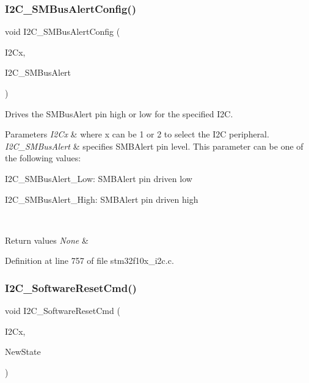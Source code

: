 \subsubsection{\texorpdfstring{I2\+C\+\_\+\+S\+M\+Bus\+Alert\+Config()}{I2C\_SMBusAlertConfig()}}
{\footnotesize\ttfamily void I2\+C\+\_\+\+S\+M\+Bus\+Alert\+Config (\begin{DoxyParamCaption}\item[{\hyperlink{struct_i2_c___type_def}{I2\+C\+\_\+\+Type\+Def} $\ast$}]{I2\+Cx,  }\item[{uint16\+\_\+t}]{I2\+C\+\_\+\+S\+M\+Bus\+Alert }\end{DoxyParamCaption})}



Drives the S\+M\+Bus\+Alert pin high or low for the specified I2C. 


\begin{DoxyParams}{Parameters}
{\em I2\+Cx} & where x can be 1 or 2 to select the I2C peripheral. \\
\hline
{\em I2\+C\+\_\+\+S\+M\+Bus\+Alert} & specifies S\+M\+B\+Alert pin level. This parameter can be one of the following values\+: \begin{DoxyItemize}
\item I2\+C\+\_\+\+S\+M\+Bus\+Alert\+\_\+\+Low\+: S\+M\+B\+Alert pin driven low \item I2\+C\+\_\+\+S\+M\+Bus\+Alert\+\_\+\+High\+: S\+M\+B\+Alert pin driven high \end{DoxyItemize}
\\
\hline
\end{DoxyParams}

\begin{DoxyRetVals}{Return values}
{\em None} & \\
\hline
\end{DoxyRetVals}


Definition at line 757 of file stm32f10x\+\_\+i2c.\+c.

\mbox{\label{group___i2_c___exported___functions_ga1289c908aeb882443aba323b459c638b}} 
\subsubsection{\texorpdfstring{I2\+C\+\_\+\+Software\+Reset\+Cmd()}{I2C\_SoftwareResetCmd()}}
{\footnotesize\ttfamily void I2\+C\+\_\+\+Software\+Reset\+Cmd (\begin{DoxyParamCaption}\item[{\hyperlink{struct_i2_c___type_def}{I2\+C\+\_\+\+Type\+Def} $\ast$}]{I2\+Cx,  }\item[{\hyperlink{group___exported__types_gac9a7e9a35d2513ec15c3b537aaa4fba1}{Functional\+State}}]{New\+State }\end{DoxyParamCaption})}



